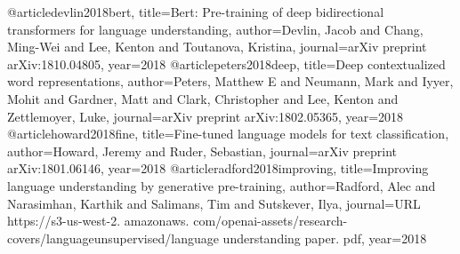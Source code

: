@article{devlin2018bert,
  title={Bert: Pre-training of deep bidirectional transformers for language understanding},
  author={Devlin, Jacob and Chang, Ming-Wei and Lee, Kenton and Toutanova, Kristina},
  journal={arXiv preprint arXiv:1810.04805},
  year={2018}
}
@article{peters2018deep,
  title={Deep contextualized word representations},
  author={Peters, Matthew E and Neumann, Mark and Iyyer, Mohit and Gardner, Matt and Clark, Christopher and Lee, Kenton and Zettlemoyer, Luke},
  journal={arXiv preprint arXiv:1802.05365},
  year={2018}
}
@article{howard2018fine,
  title={Fine-tuned language models for text classification},
  author={Howard, Jeremy and Ruder, Sebastian},
  journal={arXiv preprint arXiv:1801.06146},
  year={2018}
}
@article{radford2018improving,
  title={Improving language understanding by generative pre-training},
  author={Radford, Alec and Narasimhan, Karthik and Salimans, Tim and Sutskever, Ilya},
  journal={URL https://s3-us-west-2. amazonaws. com/openai-assets/research-covers/languageunsupervised/language understanding paper. pdf},
  year={2018}
}